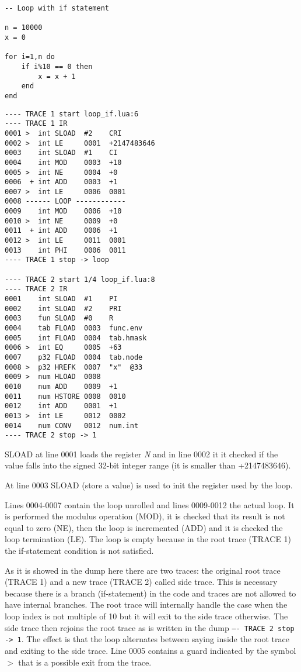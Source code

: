 \begin{lstlisting}[style=LuaStyle]
-- Loop with if statement

n = 10000
x = 0

for i=1,n do
	if i%10 == 0 then
		x = x + 1
	end
end
\end{lstlisting}

\begin{lstlisting}[style=DumpStyle]
---- TRACE 1 start loop_if.lua:6
---- TRACE 1 IR
0001 >  int SLOAD  #2    CRI
0002 >  int LE     0001  +2147483646
0003    int SLOAD  #1    CI
0004    int MOD    0003  +10 
0005 >  int NE     0004  +0  
0006  + int ADD    0003  +1  
0007 >  int LE     0006  0001
0008 ------ LOOP ------------
0009    int MOD    0006  +10 
0010 >  int NE     0009  +0  
0011  + int ADD    0006  +1  
0012 >  int LE     0011  0001
0013    int PHI    0006  0011
---- TRACE 1 stop -> loop

---- TRACE 2 start 1/4 loop_if.lua:8
---- TRACE 2 IR
0001    int SLOAD  #1    PI
0002    int SLOAD  #2    PRI
0003    fun SLOAD  #0    R
0004    tab FLOAD  0003  func.env
0005    int FLOAD  0004  tab.hmask
0006 >  int EQ     0005  +63 
0007    p32 FLOAD  0004  tab.node
0008 >  p32 HREFK  0007  "x"  @33
0009 >  num HLOAD  0008
0010    num ADD    0009  +1  
0011    num HSTORE 0008  0010
0012    int ADD    0001  +1  
0013 >  int LE     0012  0002
0014    num CONV   0012  num.int
---- TRACE 2 stop -> 1
\end{lstlisting}

SLOAD at line 0001 loads the register \textit{N} and in line 0002 it it checked if the value falls into the signed 32-bit integer range (it is smaller than +2147483646).

At line 0003 SLOAD (store a value) is used to init the register used by the loop.

Lines 0004-0007 contain the loop unrolled and lines 0009-0012 the actual loop. It is performed the modulus operation (MOD), it is checked that its result is not equal to zero (NE), then the loop is incremented (ADD) and  it is checked the loop termination (LE). The loop is empty because in the root trace (TRACE 1) the if-statement condition is not satisfied. 

As it is showed in the dump here there are  two traces: the original root trace (TRACE 1) and a new trace (TRACE 2) called side trace. This is necessary because there is a branch (if-statement) in the code and traces are not allowed to have internal branches. The root trace will internally handle the case when the loop index is not multiple of 10 but it will exit to the side trace otherwise. The side trace then rejoins the root trace as is written in the dump \texttt{---- TRACE 2 stop -> 1}. The effect is that the loop alternates between saying inside the root trace and exiting to the side trace. Line 0005 contains a guard indicated by the symbol $>$ that is a possible exit from the trace.

